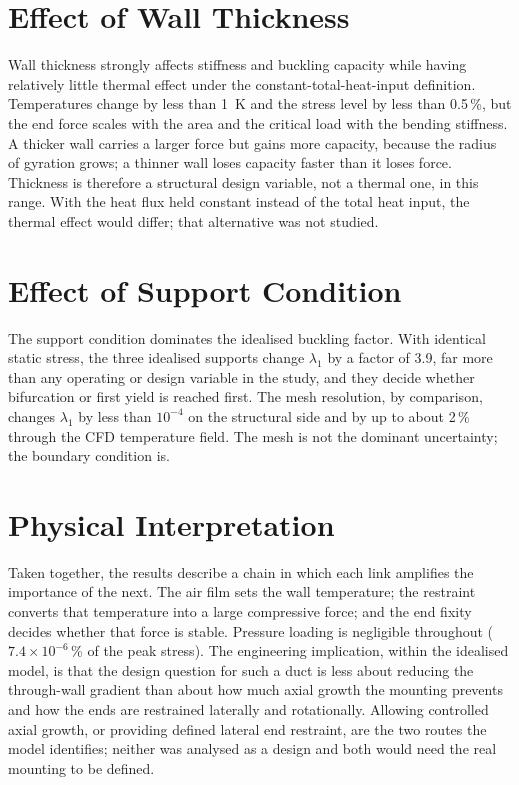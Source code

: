\section{Effect of Wall Thickness}
Wall thickness strongly affects stiffness and buckling capacity while having relatively little thermal effect under the constant-total-heat-input
definition. Temperatures change by less than 1~K and the stress level by less than 0.5\,\%, but the end force scales with the area and the
critical load with the bending stiffness. A thicker wall carries a larger force but gains more capacity, because the radius of gyration
grows; a thinner wall loses capacity faster than it loses force. Thickness is therefore a structural design variable, not a thermal one, in
this range. With the heat flux held constant instead of the total heat input, the thermal effect would differ; that alternative was not studied.

\section{Effect of Support Condition}
The support condition dominates the idealised buckling factor. With identical static stress, the three idealised supports change $\lambda_1$ by
a factor of 3.9, far more than any operating or design variable in the study, and they decide whether bifurcation or first yield is reached
first. The mesh resolution, by comparison, changes $\lambda_1$ by less than $10^{-4}$ on the structural side and by up to about 2\,\% through the
CFD temperature field. The mesh is not the dominant uncertainty; the boundary condition is.

\section{Physical Interpretation}
Taken together, the results describe a chain in which each link amplifies the importance of the next. The air film sets the wall
temperature; the restraint converts that temperature into a large compressive force; and the end fixity decides whether that force is
stable. Pressure loading is negligible throughout ($7.4\times10^{-6}$\,\% of the peak stress). The engineering implication, within the
idealised model, is that the design question for such a duct is less about reducing the through-wall gradient than about how
much axial growth the mounting prevents and how the ends are restrained laterally and rotationally. Allowing controlled axial growth, or
providing defined lateral end restraint, are the two routes the model identifies; neither was analysed as a design and both would need the
real mounting to be defined.
